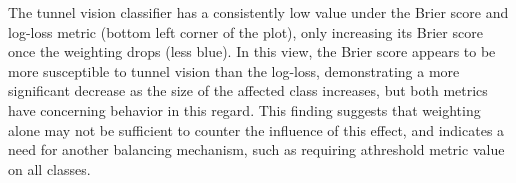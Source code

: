 
The tunnel vision classifier has a consistently low value under the Brier score and log-loss metric (bottom left corner of the plot), only increasing its Brier score once the weighting drops (less blue).
In this view, the Brier score appears to be more susceptible to tunnel vision than the log-loss, demonstrating a more significant decrease as the size of the affected class increases, but both metrics have concerning behavior in this regard.
This finding suggests that weighting alone may not be sufficient to counter the influence of this effect, and indicates a need for another balancing mechanism, such as requiring athreshold metric value on all classes.



